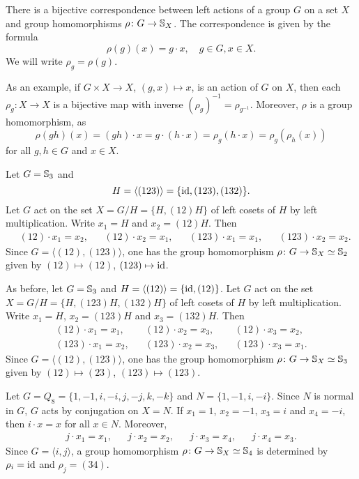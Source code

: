 There is a bijective correspondence between 
left actions of a group $G$ on a set $X$ and
group homomorphisms 
$\rho\colon G\to\mathbb{S}_X$. The correspondence is given by
the formula 
\[
\rho(g)(x)=g\cdot x,\quad g\in G,x\in X.
\]
We will write $\rho_g=\rho(g)$.

As an example, if $G\times X\to X$, $(g,x)\mapsto x$, is 
an action of $G$ on $X$, then
each $\rho_g\colon X\to X$ is a bijective map with inverse 
$(\rho_g)^{-1}=\rho_{g^{-1}}$. Moreover, 
 $\rho$ is a group homomorphism, as 
\[
\rho(gh)(x)=(gh)\cdot x=g\cdot (h\cdot x)=\rho_g(h\cdot x)=\rho_g(\rho_h(x))
\]
for all $g,h\in G$ and $x\in X$.

\begin{example}
Let $G=\mathbb{S}_3$ and 
\[
H=\langle (123)\rangle=\{\operatorname{id},(123),(132)\}.
\]
Let $G$ act on the set $X=G/H=\{H,(12)H\}$ of left cosets of $H$ 
by left multiplication. Write 
$x_1=H$ and $x_2=(12)H$. Then
\begin{align*}
&(12)\cdot x_1=x_2,
&&(12)\cdot x_2=x_1,
&&(123)\cdot x_1=x_1,
&&(123)\cdot x_2=x_2.
\end{align*}
Since $G=\langle (12),(123)\rangle$, one has the group 
homomorphism 
$\rho\colon G\to\mathbb{S}_{X}\simeq\mathbb{S}_2$ given by
$(12)\mapsto (12)$, $(123)\mapsto\operatorname{id}$.
\end{example}

\begin{example}
As before, let $G=\mathbb{S}_3$ and $H=\langle (12)\rangle=\{\operatorname{id},(12)\}$. Let $G$ act on the set $X=G/H=\{H,(123
)H,(132)H\}$ of left cosets of $H$ by left multiplication. Write 
$x_1=H$, $x_2=(123)H$ and $x_3=(132)H$. Then
\begin{align*}
(12)\cdot x_1=x_1,&& (12)\cdot x_2=x_3, && (12)\cdot x_3=x_2,\\
(123)\cdot x_1=x_2, && (123)\cdot x_2=x_3, &&(123)\cdot x_3=x_1.
\end{align*}
Since $G=\langle (12),(123)\rangle$, one has the group
homomorphism 
$\rho\colon G\to\mathbb{S}_{X}\simeq\mathbb{S}_3$ given by $(12)\mapsto (23)$, $(123)\mapsto (123)$.
\end{example}


\begin{example}
Let $G=Q_8=\{1,-1,i,-i,j,-j,k,-k\}$ and $N=\{1,-1,i,-i\}$. Since
$N$ is normal in $G$, $G$
acts by conjugation on $X=N$.
If $x_1=1$, $x_2=-1$, $x_3=i$ and $x_4=-i$, then
$i\cdot x=x$ for all $x\in N$. Moreover, 
\begin{align*}
j\cdot x_1=x_1, && j\cdot x_2=x_2, && j\cdot x_3=x_4, && j\cdot x_4=x_3.
\end{align*}
Since $G=\langle i,j\rangle$, a group homomorphism $\rho\colon G\to\mathbb{S}_X\simeq\mathbb{S}_4$ is determined by 
$\rho_i=\operatorname{id}$ and $\rho_j=(34)$.
\end{example}

